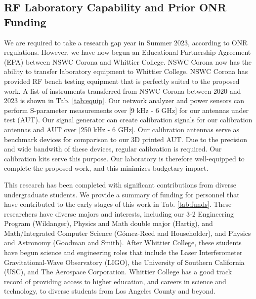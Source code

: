 \documentclass[../../main.tex]{subfiles}
\begin{document}
\subsection{RF Laboratory Capability and Prior ONR Funding}

We are required to take a research gap year in Summer 2023, according to ONR regulations.  However, we have now begun an Educational Partnership Agreement (EPA) between NSWC Corona and Whittier College.  NSWC Corona now has the ability to transfer laboratory equipment to Whittier College.  NSWC Corona has provided RF bench testing equipment that is perfectly suited to the proposed work.  A list of instruments transferred from NSWC Corona between 2020 and 2023 is shown in Tab. \ref{tab:equip}.  Our network analyzer and power sensors can perform S-parameter measurements over [9 kHz - 6 GHz] for our antennas under test (AUT).  Our signal generator can create calibration signals for our calibration antennas and AUT over [250 kHz - 6 GHz].  Our calibration antennas serve as benchmark devices for comparison to our 3D printed AUT.  Due to the precision and wide bandwith of these devices, regular calibration is required.  Our calibration kits serve this purpose.  Our laboratory is therefore well-equipped to complete the proposed work, and this minimizes budgetary impact. \\ \vspace{2.5mm}

This research has been completed with significant contributions from diverse undergraduate students.  We provide a summary of funding for personnel that have contributed to the early stages of this work in Tab. \ref{tab:funds}.  These researchers have diverse majors and interests, including our 3-2 Engineering Program (Wildanger), Physics and Math double major (Hartig), and Math/Integrated Computer Science (G\'{o}mez-Reed and Householder), and Physics and Astronomy (Goodman and Smith).   After Whittier College, these students have begun science and engineering roles that include the Laser Interferometer Gravitational-Wave Observatory (LIGO), the University of Southern California (USC), and The Aerospace Corporation.  Whittier College has a good track record of providing access to higher education, and careers in science and technology, to diverse students from Los Angeles County and beyond. \\ \vspace{2.5mm}
\end{document}
